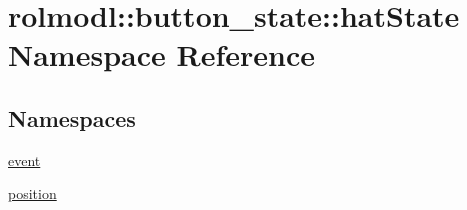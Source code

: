 \hypertarget{namespacerolmodl_1_1button__state_1_1hat_state}{}\section{rolmodl\+::button\+\_\+state\+::hat\+State Namespace Reference}
\label{namespacerolmodl_1_1button__state_1_1hat_state}
\subsection*{Namespaces}
\begin{DoxyCompactItemize}
\item 
 \mbox{\hyperlink{namespacerolmodl_1_1button__state_1_1hat_state_1_1event}{event}}
\item 
 \mbox{\hyperlink{namespacerolmodl_1_1button__state_1_1hat_state_1_1position}{position}}
\end{DoxyCompactItemize}
